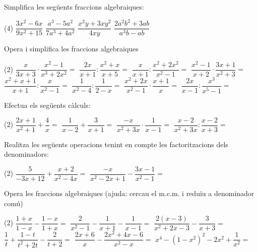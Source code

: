 \documentclass[11pt, a4paper, pdf]{article}
\let\frac\dfrac
\begin{document}
\begin{mylist}
	
\item  Simplifica les següents fraccions algebraiques:
\begin{tasks}(4)	
	\task $\dfrac{3x^{2} -6x}{9x^{2} +15} $ 
	\task $\dfrac{a^{3} -5a^{2} }{7a^{3} +4a^{2} } $ 
	\task $\dfrac{x^{2} y+3xy^{2} }{4xy} $  
	\task$\dfrac{2a^{2} b^{2} +3ab}{a^{3} b-ab} $
\end{tasks}



 
 
\item Opera i simplifica les fraccions algebraiques
\begin{tasks}(2)
	\task $\dfrac{x}{3x+3} \cdot \dfrac{x^{2} -1}{x^{3} +2x^{2} } =$  
	\task $\dfrac{2x}{x+1} :\dfrac{x^{2} +x}{x+5} =$      
	\task $\dfrac{x}{x+1} :\dfrac{x^{2} +2x^{2} }{x^{2} -1} =$
	\task $\dfrac{x^{2} -1}{x+2} \cdot \dfrac{3x+1}{x^{2} +3} =$      
	\task $\dfrac{x^{2} +x+1}{x+1} :\dfrac{x}{x^{2} -1} =$    
	\task $\dfrac{1}{x^{2} -4} :\dfrac{1}{2-x}= $
	\task  $\dfrac{x^{2} +2x}{x^{2} -1} \cdot \dfrac{x+1}{x} =$  
	\task $\dfrac{2x}{x-1} :\dfrac{x^{3} }{x^{5} -1} =$
\end{tasks}



\item  Efectua els següents càlculs: 
\begin{tasks}(2)
	\task $\dfrac{2x+1}{x^{2} +1} +\dfrac{4}{x} =$ 
	\task $\dfrac{1}{x-2} +\dfrac{3}{x+1} =$  
	\task $\dfrac{-x}{x^{2} +3x} \cdot \dfrac{1}{x-1} =$ 
	\task $\dfrac{x-2}{x^{2} +3x} :\dfrac{x-2}{x+3}= $
\end{tasks}


\item  Realitza les següents operacions tenint en compte les factoritzacions dels denominadors:
\begin{tasks}(2)
	\task $\dfrac{5}{-3x+12} +\dfrac{x+2}{x^{2} -4x} = $  
	\task $\dfrac{-x}{x^{2} -2x+1} -\dfrac{3x-1}{x^{2} -1} =$
\end{tasks}


\item   Opera les fraccions algebraiques ({ajuda: cercau el m.c.m. i redu\"{i}u a denominador com\'{u}})
\begin{tasks}(2)
	\task  $\dfrac{1+x}{1-x} -\dfrac{1-x}{1+x} =$   
	\task   $\dfrac{2}{x^{2} -1} -\dfrac{1}{x+1} -\frac{1}{x-1} =$ 
	\task $\dfrac{2(x-3)}{x^{2} +2x-3} -\dfrac{3}{x+3} =$  
	\task   $\dfrac{1}{t} +\dfrac{1-t}{t^{2} +2t} -\dfrac{2}{t+2} =$
	\task  $\dfrac{2x+6}{x} -\dfrac{2x^{2} +4x-6}{x^{2} -x} =$      
	\task   $x^{4} -(1-x^{2} )^{2} -2x^{2} +\dfrac{1}{x^{2} } =$
\end{tasks}

 

\end{mylist}
\end{document}
